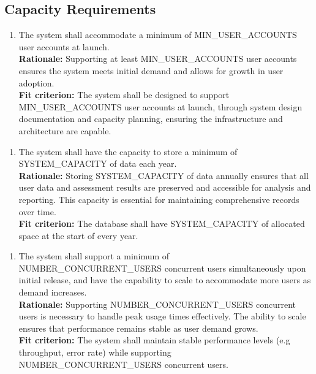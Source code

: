 \documentclass[12pt]{article}
\begin{document}
\subsection{Capacity Requirements}
\begin{enumerate}[label={PR-CR}1. ]
  \item The system shall accommodate a minimum of MIN\_USER\_ACCOUNTS user accounts at launch.\\
  \textbf{Rationale: }Supporting at least MIN\_USER\_ACCOUNTS user accounts ensures the system meets initial demand and allows for growth in user adoption.\\
  \textbf{Fit criterion: }The system shall be designed to support\\ MIN\_USER\_ACCOUNTS user accounts at launch, through system design documentation and capacity planning, ensuring the infrastructure and architecture are capable.
\end{enumerate}
\begin{enumerate}[label={PR-CR}2. ]
  \item The system shall have the capacity to store a minimum of\\ SYSTEM\_CAPACITY of data each year.\\
  \textbf{Rationale: }Storing SYSTEM\_CAPACITY of data annually ensures that all user data and assessment results are preserved and accessible for analysis and reporting. This capacity is essential for maintaining comprehensive records over time.\\
  \textbf{Fit criterion: }The database shall have SYSTEM\_CAPACITY of allocated space at the start of every year.  
\end{enumerate}
\begin{enumerate}[label={PR-CR}3. ]
  \item The system shall support a minimum of NUMBER\_CONCURRENT\_USERS concurrent users simultaneously upon initial release, and have the capability to scale to accommodate more users as demand increases.\\
  \textbf{Rationale: }Supporting NUMBER\_CONCURRENT\_USERS concurrent users is necessary to handle peak usage times effectively. The ability to scale ensures that performance remains stable as user demand grows.\\
  \textbf{Fit criterion: }The system shall maintain stable performance levels (e.g throughput, error rate) while supporting NUMBER\_CONCURRENT\_USERS concurrent users.  
\end{enumerate}
\end{document}
